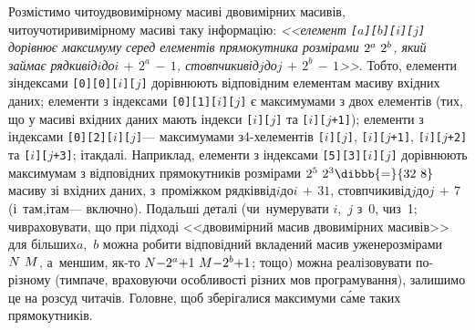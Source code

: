 Розмістимо чи\nolinebreak[3] то\nolinebreak[2] у\nolinebreak[3] двовимірному масиві двовимірних масивів, чи\nolinebreak[3] то\nolinebreak[2] у\nolinebreak[3] чотиривимірному масиві таку інформацію: \textsl{<<елемент \texttt{[$a$][$b$][$i$][$j$]} дорівнює максимуму серед елементів прямокутника розмірами ${2^a\,{\*}\,2^b}$, який займає 
рядки\nolinebreak[2] від\nolinebreak[3] $i$\nolinebreak[2] до\nolinebreak[3] ${i\,{+}\,2^a\,{-}\,1}$,
стовпчики\nolinebreak[2] від\nolinebreak[3] $j$\nolinebreak[2] до\nolinebreak[3] ${j\,{+}\,2^b\,{-}\,1}$>>}. Тобто, елементи з\nolinebreak[3] індексами \texttt{[0][0][$i$][$j$]} дорівнюють відповідним елементам масиву вхідних даних; елементи з індексами \texttt{[0][1][$i$][$j$]} є максимумами з двох елементів (тих, що у масиві вхідних даних мають індекси \texttt{[$i$][$j$]} та \texttt{[$i$][$j$+1]}); елементи з індексами \texttt{[0][2][$i$][$j$]}\nolinebreak[3] --- максимумами з\nolinebreak[2] \mbox{4-х}\nolinebreak[2] елементів \texttt{[$i$][$j$]},\hspace{0pt plus 0.25em} \texttt{[$i$][$j$+1]},\hspace{0pt plus 0.25em} \texttt{[$i$][$j$+2]} та \texttt{[$i$][$j$+3]}; і\nolinebreak[3] так\nolinebreak[3] далі. Наприклад, елементи з індексами \texttt{[5][3][$i$][$j$]} дорівнюють максимумам з відповідних прямокутників розмірами ${2^5\,{\*}\,2^3}\dibbb{{=}}{32\,{\*}\,8}$ масиву зі вхідних даних, з~проміжком 
рядків\nolinebreak[2] від\nolinebreak[3] $i$\nolinebreak[2] до\nolinebreak[3] ${i\,{+}\,31}$,
стовпчики\nolinebreak[2] від\nolinebreak[3] $j$\nolinebreak[2] до\nolinebreak[3] ${j\,{+}\,7}$
(і~там,\nolinebreak[2] і\nolinebreak[3] там\nolinebreak[3] --- включно).
Подальші деталі (чи~нумерувати $i$,~$j$ з~0, чи\nolinebreak[3] з~1; чи\nolinebreak[3] враховувати, що при підході <<двовимірний масив двовимірних масивів>> для більших\nolinebreak[2] $a$,~$b$ можна робити відповідний вкладений масив уже\nolinebreak[3] не\nolinebreak[3] розмірами ${N\,{\*}\,M}$, а~меншим, як-то ${N{-}2^a{+}1\,{\*}\,M{-}2^b{+}1}$; тощо) можна реалізовувати по-різному (тим\nolinebreak[3] паче, враховуючи особливості різних мов програмування), залишимо це на розсуд читачів. 
Головне, щоб зберігалися максимуми с\'{а}ме таких прямокутників.

